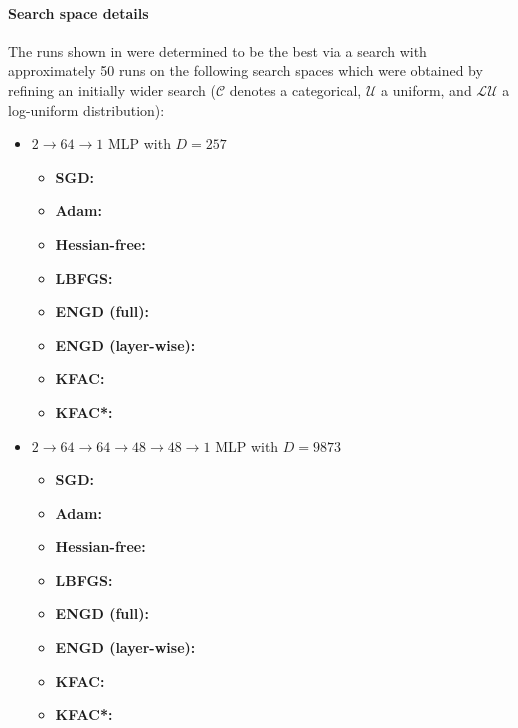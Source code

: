 \paragraph{Search space details} The runs shown in  were determined to be the best via a search with approximately 50 runs on the following search spaces which were obtained by refining an initially wider search ($\mathcal{C}$ denotes a categorical, $\mathcal{U}$ a uniform, and $\mathcal{LU}$ a log-uniform distribution):
\begin{itemize}
\item $2\to 64\to 1$ MLP with $D=257$
  \begin{itemize}
    \def\pathToRuns{../kfac_pinns_exp/exp09_reproduce_poisson2d/tex}
  \item \textbf{SGD:} 
  \item \textbf{Adam:} 
  \item \textbf{Hessian-free:} 
  \item \textbf{LBFGS:} 
  \item \textbf{ENGD (full):} 
  \item \textbf{ENGD (layer-wise):} 
  \item \textbf{KFAC:} 
  \item \textbf{KFAC*:} 
  \end{itemize}

\item $2 \to 64 \to 64 \to 48 \to 48 \to 1$ MLP with $D=\num{9873}$
  \begin{itemize}
    \def\pathToRuns{../kfac_pinns_exp/exp15_poisson2d_deepwide/tex}
  \item \textbf{SGD:} 
  \item \textbf{Adam:} 
  \item \textbf{Hessian-free:} 
  \item \textbf{LBFGS:} 
  \item \textbf{ENGD (full):} 
  \item \textbf{ENGD (layer-wise):} 
  \item \textbf{KFAC:} 
  \item \textbf{KFAC*:} 
  \end{itemize}


\end{itemize}
